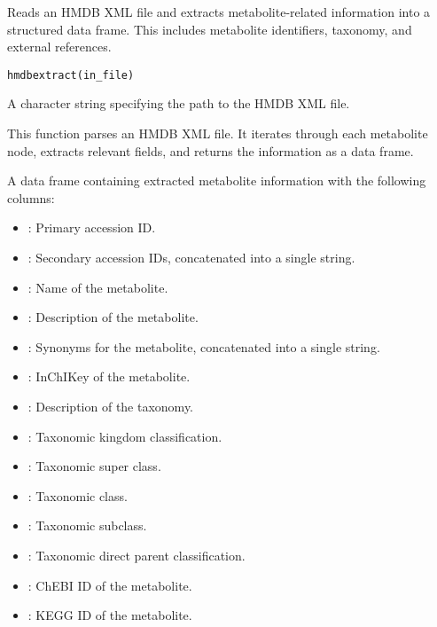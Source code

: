 \documentclass[a4paper]{book}
\begin{document}
%
\begin{Description}
Reads an HMDB XML file and extracts metabolite-related information into a structured data frame.
This includes metabolite identifiers, taxonomy, and external references.
\end{Description}
%
\begin{Usage}
\begin{verbatim}
hmdbextract(in_file)
\end{verbatim}
\end{Usage}
%
\begin{Arguments}
\begin{ldescription}
\item[\code{in\_file}] A character string specifying the path to the HMDB XML file.
\end{ldescription}
\end{Arguments}
%
\begin{Details}
This function parses an HMDB XML file. It iterates through each metabolite
node, extracts relevant fields, and returns the information as a data frame.
\end{Details}
%
\begin{Value}
A data frame containing extracted metabolite information with the following columns:
\begin{itemize}

\item{} : Primary accession ID.
\item{} : Secondary accession IDs, concatenated into a single string.
\item{} : Name of the metabolite.
\item{} : Description of the metabolite.
\item{} : Synonyms for the metabolite, concatenated into a single string.
\item{} : InChIKey of the metabolite.
\item{} : Description of the taxonomy.
\item{} : Taxonomic kingdom classification.
\item{} : Taxonomic super class.
\item{} : Taxonomic class.
\item{} : Taxonomic subclass.
\item{} : Taxonomic direct parent classification.
\item{} : ChEBI ID of the metabolite.
\item{} : KEGG ID of the metabolite.

\end{itemize}

\end{Value}
\end{document}
